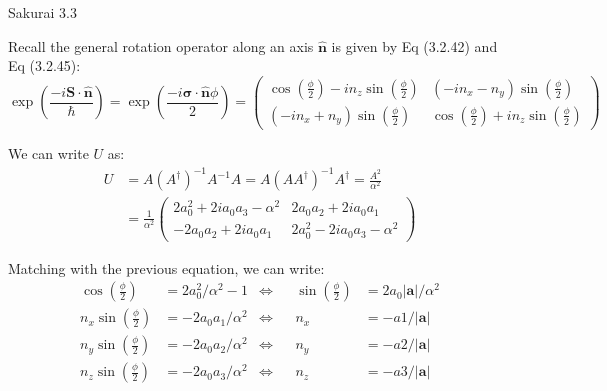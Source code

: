 \documentclass{article}
\newcommand{\bs}{\boldsymbol}
\begin{document}
\begin{section}{Sakurai 3.3}
\begin{enumerate}
	\begin{tcolorbox}
		Recall the general rotation operator along an axis $\bs{\hat{n}}$ is given by Eq (3.2.42) and Eq (3.2.45):
		$$
			\exp \left( \frac{-i \bs{S} \cdot \bs{\hat{n}}}{\hbar} \right) = \exp \left( \frac{-i \bs{\sigma} \cdot \bs{\hat{n}} \phi}{2} \right) = \begin{pmatrix}
				\cos \left( \frac{\phi}{2} \right) - i n_z \sin \left( \frac{\phi}{2} \right)
				 & (-i n_x - n_y) \sin \left( \frac{\phi}{2} \right)                             \\
				(-i n_x + n_y) \sin \left( \frac{\phi}{2} \right)
				 & \cos \left( \frac{\phi}{2} \right) + i n_z \sin \left( \frac{\phi}{2} \right)
			\end{pmatrix}
		$$

		We can write $U$ as:
		\begin{align*}
			U & = A(A^\dagger)^{-1}A^{-1}A = A(A A^\dagger)^{-1}A^\dagger = \frac{A^2}{\alpha^2} \\
			  & = \frac{1}{\alpha^2} \begin{pmatrix}
				                         2a_0^2 + 2ia_0a_3 - \alpha^2 & 2a_0a_2 + 2ia_0a_1           \\
				                         -2a_0a_2 + 2ia_0a_1          & 2a_0^2 - 2ia_0a_3 - \alpha^2
			                         \end{pmatrix}
		\end{align*}

		Matching with the previous equation, we can write:
		\begin{align*}
			\cos \left( \frac{\phi}{2} \right)     & = 2a_0^2/\alpha^2 - 1 & \iff &  & \sin \left( \frac{\phi}{2} \right) & = 2 a_0|\bs{a}|/\alpha^2 \\
			n_x \sin \left( \frac{\phi}{2} \right) & = -2a_0a_1/\alpha^2   & \iff &  & n_x                                & = -a1/\bs{|a|}           \\
			n_y \sin \left( \frac{\phi}{2} \right) & = -2a_0a_2/\alpha^2   & \iff &  & n_y                                & = -a2/\bs{|a|}           \\
			n_z \sin \left( \frac{\phi}{2} \right) & = -2a_0a_3/\alpha^2   & \iff &  & n_z                                & = -a3/\bs{|a|}           \\
		\end{align*}
	\end{tcolorbox}
\end{enumerate}
\end{section}
\end{document}
